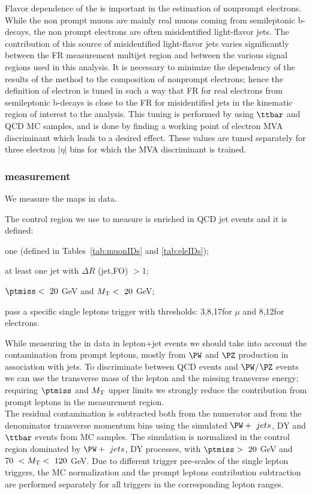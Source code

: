 Flavor dependence of the \fr is important in the estimation of
nonprompt electrons. While the non prompt muons are mainly real muons
coming from semileptonic b-decays, the non prompt electrons are often
misidentified light-flavor jets. The contribution of this source of misidentified light-flavor jets varies significantly between 
the FR measurement multijet region and between the various signal
regions used in this analysis. It is necessary to minimize the
dependency of the results of the method to the composition of
nonprompt electrons; hence the definition
of \lo electron is tuned in such a way that FR for real electrons from semileptonic b-decays
is close to the FR for misidentified jets in the kinematic region of interest to the analysis. 
This tuning is performed by using $\ttbar$ and QCD MC samples, and is
done by finding a working point of 
electron MVA discriminant which leads to a desired effect. These values are tuned separately 
for three electron $|\eta|$ bins for which the MVA discriminant is
trained. 

\subsubsection{\fr measurement} \label{sec:singleFR}
We measure the \fr maps in data.

The control region we use to measure is enriched in QCD jet events and
it is defined:
\begin{itemize}
\setlength\itemsep{-0.2em}
  {\footnotesize
	\item one \fo (defined in Tables~\ref{tab:muonIDs} and \ref{tab:eleIDs});
	\item at least one jet with $\Delta R$ (jet,FO) $>1$;
	\item $\ptmiss < \ 20$ GeV and $M_{\mathrm{T}} < \ 20 $ GeV;
	\item pass a specific single leptons trigger with \pt thresholds:
          3,8,17\GeV for $\mu$ and 8,12\GeV for electrons.}
\end{itemize}

While measuring the \fr in data in lepton+jet events we should take into account the contamination from prompt leptons, mostly from $\PW$ and $\PZ$ production in association with jets.
 To discriminate between QCD events and $\PW$/$\PZ$ events we can use the transverse mass of the lepton and the missing transverse energy; requiring $\ptmiss$ and $M_{\mathrm{T}}$ upper limits we strongly reduce
  the contribution from prompt leptons in the measurement region. \\
The residual contamination is subtracted both from the numerator and from the denominator transverse momentum bins using the simulated $\PW + \ jets$, DY and $\ttbar$ events from MC samples. The simulation is normalized in the control region dominated by $\PW + \ jets$, DY processes, with $\ptmiss > \ 20$ GeV and $70 \ < M_{\mathrm{T}} < \ 120 $ GeV.
Due to different trigger pre-scales of the single lepton triggers, the
MC normalization and the prompt leptons contribution subtraction are
performed separately for all triggers in the corresponding lepton \pt ranges.


